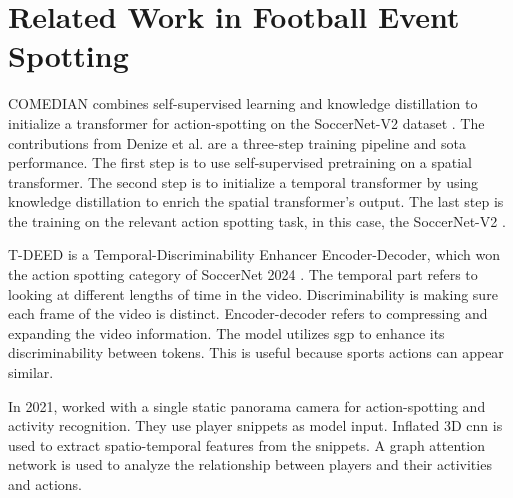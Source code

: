 \section{Related Work in Football Event Spotting}
\label{sec:fw_work}

COMEDIAN \cite{denize_comedian_2024} combines self-supervised learning and knowledge distillation to initialize a transformer for action-spotting on the SoccerNet-V2 dataset \cite{deliege_soccernet-v2_dataset_2021}. The contributions from Denize et al. are a three-step training pipeline and \acrshort{sota} performance. The first step is to use self-supervised pretraining on a spatial transformer. The second step is to initialize a temporal transformer by using knowledge distillation to enrich the spatial transformer's output. The last step is the training on the relevant action spotting task, in this case, the SoccerNet-V2 \cite{deliege_soccernet-v2_dataset_2021}.

T-DEED \cite{xarles_t-deed_2024} is a Temporal-Discriminability Enhancer Encoder-Decoder, which won the action spotting category of SoccerNet 2024 \cite{cioppa_soccernet_2024}. The temporal part refers to looking at different lengths of time in the video. Discriminability is making sure each frame of the video is distinct. Encoder-decoder refers to compressing and expanding the video information. The model utilizes \acrfull{sgp} to enhance its discriminability between tokens. This is useful because sports actions can appear similar. 

In 2021, \textcite{gerats_individual_same_task_2021} worked with a single static panorama camera for action-spotting and activity recognition. They use player snippets as model input. Inflated 3D \acrshort{cnn} is used to extract spatio-temporal features from the snippets. A graph attention network is used to analyze the relationship between players and their activities and actions.




